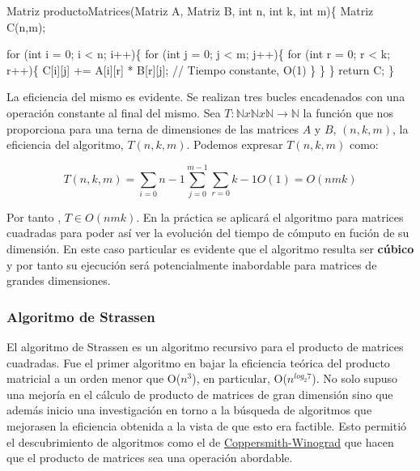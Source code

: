 \documentclass[]{article}
\newenvironment{Shaded}{\begin{snugshade}}{\end{snugshade}}
\newcommand{\KeywordTok}[1]{\textcolor[rgb]{0.94,0.87,0.69}{{#1}}}
\newcommand{\DataTypeTok}[1]{\textcolor[rgb]{0.87,0.87,0.75}{{#1}}}
\newcommand{\DecValTok}[1]{\textcolor[rgb]{0.86,0.86,0.80}{{#1}}}
\newcommand{\CommentTok}[1]{\textcolor[rgb]{0.50,0.62,0.50}{{#1}}}
\newcommand{\NormalTok}[1]{\textcolor[rgb]{0.80,0.80,0.80}{{#1}}}
\begin{document}
\begin{Shaded}
\begin{Highlighting}[]
\NormalTok{Matriz productoMatrices(Matriz A, Matriz B, }\DataTypeTok{int} \NormalTok{n, }\DataTypeTok{int} \NormalTok{k, }\DataTypeTok{int} \NormalTok{m)\{}
    \NormalTok{Matriz C(n,m);}

    \KeywordTok{for} \NormalTok{(}\DataTypeTok{int} \NormalTok{i = }\DecValTok{0}\NormalTok{; i < n; i++)\{}
        \KeywordTok{for} \NormalTok{(}\DataTypeTok{int} \NormalTok{j = }\DecValTok{0}\NormalTok{; j < m; j++)\{}
            \KeywordTok{for} \NormalTok{(}\DataTypeTok{int} \NormalTok{r = }\DecValTok{0}\NormalTok{; r < k; r++)\{}
                \NormalTok{C[i][j] += A[i][r] * B[r][j]; }\CommentTok{// Tiempo constante, O(1)}
            \NormalTok{\}}
        \NormalTok{\}}
    \NormalTok{\}}
    \KeywordTok{return} \NormalTok{C;}
\NormalTok{\}}
\end{Highlighting}
\end{Shaded}

La eficiencia del mismo es evidente. Se realizan tres bucles encadenados
con una operación constante al final del mismo. Sea
\(T: \mathbb{N}x\mathbb{N}x\mathbb{N} \rightarrow \mathbb{N}\) la
función que nos proporciona para una terna de dimensiones de las
matrices \(A\) y \(B\), \((n,k,m)\), la eficiencia del algoritmo,
\(T(n,k,m)\). Podemos expresar \(T(n,k,m)\) como:

\[ T(n,k,m) =  \sum_{i=0}{n-1}\sum_{j=0}^{m-1}\sum_{r=0}{k-1}O(1) = O(n m k) \]

Por tanto , \(T \in O(nmk)\). En la práctica se aplicará el algoritmo
para matrices cuadradas para poder así ver la evolución del tiempo de
cómputo en fución de su dimensión. En este caso particular es evidente
que el algoritmo resulta ser \textbf{cúbico} y por tanto su ejecución
será potencialmente inabordable para matrices de grandes dimensiones.

\subsubsection{Algoritmo de Strassen}\label{algoritmo-de-strassen}

El algoritmo de Strassen es un algoritmo recursivo para el producto de
matrices cuadradas. Fue el primer algoritmo en bajar la eficiencia
teórica del producto matricial a un orden menor que O(\(n^3\)), en
particular, O(\(n^{log_{2}7}\)). No solo supuso una mejoría en el
cálculo de producto de matrices de gran dimensión sino que además inicio
una investigación en torno a la búsqueda de algoritmos que mejorasen la
eficiencia obtenida a la vista de que esto era factible. Esto permitió
el descubrimiento de algoritmos como el de
\href{http://en.wikipedia.org/wiki/Coppersmith-Winograd_algorithm}{Coppersmith-Winograd}
que hacen que el producto de matrices sea una operación abordable.
\end{document}
